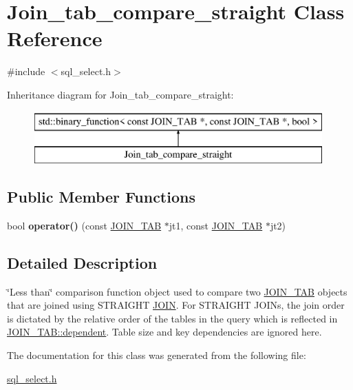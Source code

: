 \hypertarget{classJoin__tab__compare__straight}{}\section{Join\+\_\+tab\+\_\+compare\+\_\+straight Class Reference}
\label{classJoin__tab__compare__straight}


{\ttfamily \#include $<$sql\+\_\+select.\+h$>$}

Inheritance diagram for Join\+\_\+tab\+\_\+compare\+\_\+straight\+:\begin{figure}[H]
\begin{center}
\leavevmode
\includegraphics[height=2.000000cm]{classJoin__tab__compare__straight}
\end{center}
\end{figure}
\subsection*{Public Member Functions}
\begin{DoxyCompactItemize}
\item 
\mbox{\label{classJoin__tab__compare__straight_a3a71abfffed835b4c294e4eb6c77f45b}} 
bool {\bfseries operator()} (const \mbox{\hyperlink{classJOIN__TAB}{J\+O\+I\+N\+\_\+\+T\+AB}} $\ast$jt1, const \mbox{\hyperlink{classJOIN__TAB}{J\+O\+I\+N\+\_\+\+T\+AB}} $\ast$jt2)
\end{DoxyCompactItemize}


\subsection{Detailed Description}
\char`\"{}\+Less than\char`\"{} comparison function object used to compare two \mbox{\hyperlink{classJOIN__TAB}{J\+O\+I\+N\+\_\+\+T\+AB}} objects that are joined using S\+T\+R\+A\+I\+G\+HT \mbox{\hyperlink{classJOIN}{J\+O\+IN}}. For S\+T\+R\+A\+I\+G\+HT J\+O\+I\+Ns, the join order is dictated by the relative order of the tables in the query which is reflected in \mbox{\hyperlink{classJOIN__TAB_a4a7181c7fe524e9d026b688956f01b67}{J\+O\+I\+N\+\_\+\+T\+A\+B\+::dependent}}. Table size and key dependencies are ignored here. 

The documentation for this class was generated from the following file\+:\begin{DoxyCompactItemize}
\item 
\mbox{\hyperlink{sql__select_8h}{sql\+\_\+select.\+h}}\end{DoxyCompactItemize}

